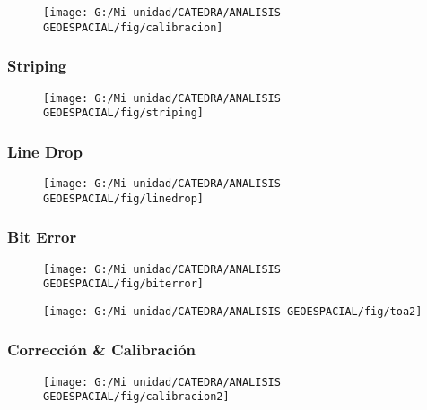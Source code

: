 \documentclass[14pt]{beamer}
\begin{document}
\begin{frame}
\scriptsize{}
  \begin{figure}
    \centering
    \texttt{[image: G:/Mi unidad/CATEDRA/ANALISIS GEOESPACIAL/fig/calibracion]}
  \end{figure}
\end{frame}
\begin{frame}
\frametitle{Striping}
\scriptsize{}
  \begin{figure}
    \centering
    \texttt{[image: G:/Mi unidad/CATEDRA/ANALISIS GEOESPACIAL/fig/striping]}
  \end{figure}
\end{frame}
\begin{frame}
\frametitle{Line Drop}
\scriptsize{}
  \begin{figure}
    \centering
    \texttt{[image: G:/Mi unidad/CATEDRA/ANALISIS GEOESPACIAL/fig/linedrop]}
  \end{figure}
\end{frame}
\begin{frame}
\frametitle{Bit Error}
\scriptsize{}
  \begin{figure}
    \centering
    \texttt{[image: G:/Mi unidad/CATEDRA/ANALISIS GEOESPACIAL/fig/biterror]}
  \end{figure}
\end{frame}
\begin{frame}
\scriptsize{}
  \begin{figure}
    \centering
    \texttt{[image: G:/Mi unidad/CATEDRA/ANALISIS GEOESPACIAL/fig/toa2]}
     \end{figure}
\end{frame}
\begin{frame}
\frametitle{Corrección \& Calibración}
\scriptsize{}
  \begin{figure}
    \centering
    \texttt{[image: G:/Mi unidad/CATEDRA/ANALISIS GEOESPACIAL/fig/calibracion2]}
     \end{figure}
\end{frame}
\end{document}
